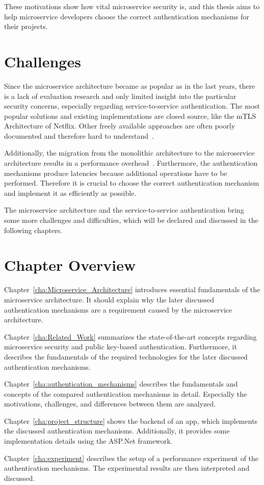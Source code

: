 These motivations show how vital microservice security is, and this thesis aims to help microservice developers choose the correct authentication mechanisms for their projects.

\section{Challenges}
Since the microservice architecture became as popular as in the last years, there is a lack of evaluation research and only limited insight into the particular security concerns, especially regarding service-to-service authentication. 
The most popular solutions and existing implementations are closed source, like the mTLS Architecture of Netflix.
Other freely available approaches are often poorly documented and therefore hard to understand~\cite{yarygina2018overcoming}.

Additionally, the migration from the monolithic architecture to the microservice architecture results in a performance overhead~\cite{ueda2016workload}.
Furthermore, the authentication mechanisms produce latencies because additional operations have to be performed.
Therefore it is crucial to choose the correct authentication mechanism and implement it as efficiently as possible.

The microservice architecture and the service-to-service authentication bring some more challenges and difficulties, which will be declared and discussed in the following chapters.

\section{Chapter Overview}
Chapter~\ref{cha:Microservice_Architecture} introduces essential fundamentals of the microservice architecture. 
It should explain why the later discussed authentication mechanisms are a requirement caused by the microservice architecture.

\noindent Chapter~\ref{cha:Related_Work} summarizes the state-of-the-art concepts regarding microservice security and public key-based authentication.
Furthermore, it describes the fundamentals of the required technologies for the later discussed authentication mechanisms.

\noindent Chapter~\ref{cha:authentication_mechanisms} describes the fundamentals and concepts of the compared authentication mechanisms in detail.
Especially the motivations, challenges, and differences between them are analyzed.

\noindent Chapter~\ref{cha:project_structure} shows the backend of an app, which implements the discussed authentication mechanisms.
Additionally, it provides some implementation details using the ASP.Net framework.

\noindent Chapter~\ref{cha:experiment} describes the setup of a performance experiment of the authentication mechanisms.
The experimental results are then interpreted and discussed.
